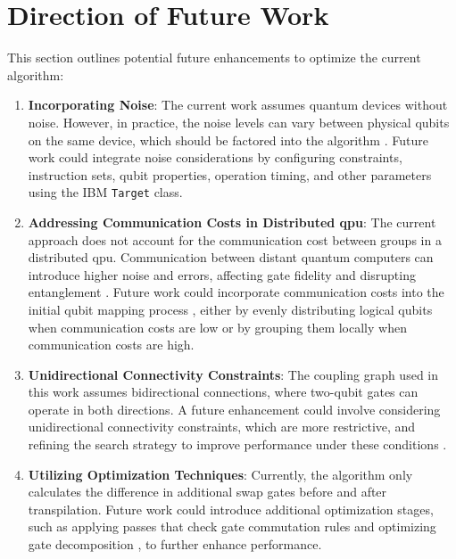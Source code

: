 \section{Direction of Future Work} %
This section outlines potential future enhancements to optimize the current algorithm:
\begin{enumerate}[nolistsep]
    \item \textbf{Incorporating Noise}: The current work assumes quantum devices without noise. However, in practice, the noise levels can vary between physical qubits on the same device, which should be factored into the algorithm \cite{niu_hardware_2020}. Future work could integrate noise considerations by configuring constraints, instruction sets, qubit properties, operation timing, and other parameters using the IBM \lstinline{Target} \cite{ibmquantum_target} class.
    \item \textbf{Addressing Communication Costs in Distributed \acrshort{qpu}}: The current approach does not account for the communication cost between groups in a distributed \acrshort{qpu}. Communication between distant quantum computers can introduce higher noise and errors, affecting gate fidelity and disrupting entanglement \cite{murali_noise_adaptive_2019}. Future work could incorporate communication costs into the initial qubit mapping process \cite{houshmand_evolutionary_2020}, either by evenly distributing logical qubits when communication costs are low or by grouping them locally when communication costs are high.
    \item \textbf{Unidirectional Connectivity Constraints}: The coupling graph used in this work assumes bidirectional connections, where two-qubit gates can operate in both directions. A future enhancement could involve considering unidirectional connectivity constraints, which are more restrictive, and refining the search strategy to improve performance under these conditions \cite{sanaei_one_2019}.
    \item \textbf{Utilizing Optimization Techniques}: Currently, the algorithm only calculates the difference in additional swap gates before and after transpilation. Future work could introduce additional optimization stages, such as applying passes that check gate commutation rules \cite{itoko_quantum_2019} and optimizing gate decomposition \cite{rudolph_decomposition_2024}, to further enhance performance.
\end{enumerate}